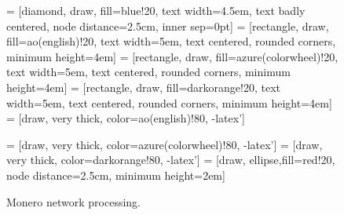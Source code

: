 \documentclass[
  printed, %
  table,   %
  nolof,     %
  nolot,     %
           oneside, color
]{fithesis3}
\begin{document}
\begin{figure}[H]
\center
{} = [diamond, draw, fill=blue!20,
    text width=4.5em, text badly centered, node distance=2.5cm, inner sep=0pt]
 = [rectangle, draw, fill=ao(english)!20,
    text width=5em, text centered, rounded corners, minimum height=4em]
 = [rectangle, draw, fill=azure(colorwheel)!20,
    text width=5em, text centered, rounded corners, minimum height=4em]
 = [rectangle, draw, fill=darkorange!20,
    text width=5em, text centered, rounded corners, minimum height=4em]
 = [draw, very thick, color=ao(english)!80, -latex']

 = [draw, very thick, color=azure(colorwheel)!80, -latex']
 = [draw, very thick, color=darkorange!80, -latex']
 = [draw, ellipse,fill=red!20, node distance=2.5cm,
    minimum height=2em]

\caption{Monero network processing.}
\label{pict:network-processing}
\end{figure}
\end{document}
